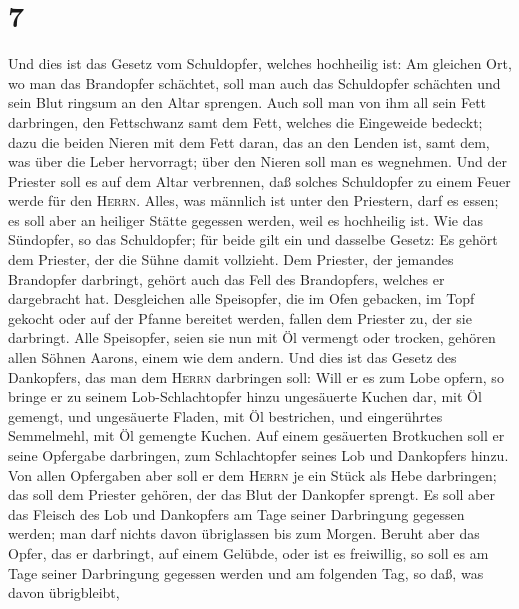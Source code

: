\hypertarget{section-6}{%
\section{7}\label{section-6}}

 Und dies ist das Gesetz vom Schuldopfer, welches
hochheilig ist:  Am gleichen Ort, wo man das Brandopfer
schächtet, soll man auch das Schuldopfer schächten und sein Blut ringsum
an den Altar sprengen.  Auch soll man von ihm all sein
Fett darbringen, den Fettschwanz samt dem Fett, welches die Eingeweide
bedeckt;  dazu die beiden Nieren mit dem Fett daran, das
an den Lenden ist, samt dem, was über die Leber hervorragt; über den
Nieren soll man es wegnehmen.  Und der Priester soll es
auf dem Altar verbrennen, daß solches Schuldopfer zu einem Feuer werde
für den \textsc{Herrn}.  Alles, was männlich ist unter den
Priestern, darf es essen; es soll aber an heiliger Stätte gegessen
werden, weil es hochheilig ist.  Wie das Sündopfer, so das
Schuldopfer; für beide gilt ein und dasselbe Gesetz: Es gehört dem
Priester, der die Sühne damit vollzieht.  Dem Priester,
der jemandes Brandopfer darbringt, gehört auch das Fell des Brandopfers,
welches er dargebracht hat.  Desgleichen alle Speisopfer,
die im Ofen gebacken, im Topf gekocht oder auf der Pfanne bereitet
werden, fallen dem Priester zu, der sie darbringt.  Alle
Speisopfer, seien sie nun mit Öl vermengt oder trocken, gehören allen
Söhnen Aarons, einem wie dem andern.  Und dies ist das
Gesetz des Dankopfers, das man dem \textsc{Herrn} darbringen soll:
 Will er es zum Lobe opfern, so bringe er zu seinem
Lob-Schlachtopfer hinzu ungesäuerte Kuchen dar, mit Öl gemengt, und
ungesäuerte Fladen, mit Öl bestrichen, und eingerührtes Semmelmehl, mit
Öl gemengte Kuchen.  Auf einem gesäuerten Brotkuchen soll
er seine Opfergabe darbringen, zum Schlachtopfer seines Lob und
Dankopfers hinzu.  Von allen Opfergaben aber soll er dem
\textsc{Herrn} je ein Stück als Hebe darbringen; das soll dem Priester
gehören, der das Blut der Dankopfer sprengt.  Es soll
aber das Fleisch des Lob und Dankopfers am Tage seiner Darbringung
gegessen werden; man darf nichts davon übriglassen bis zum Morgen.
 Beruht aber das Opfer, das er darbringt, auf einem
Gelübde, oder ist es freiwillig, so soll es am Tage seiner Darbringung
gegessen werden und am folgenden Tag, so daß, was davon übrigbleibt,
